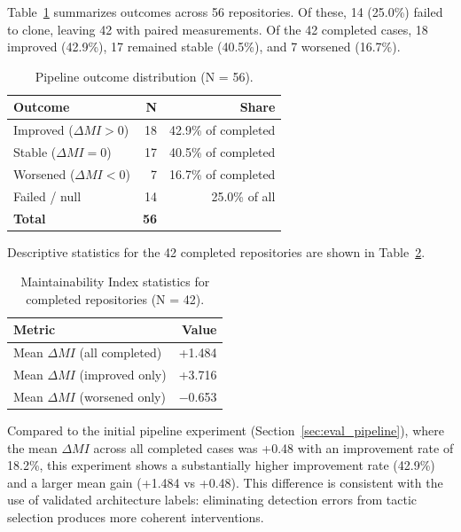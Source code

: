 \documentclass[sigconf,review,anonymous]{acmart}
\begin{document}
Table~\ref{tab:exp5_outcomes} summarizes outcomes across 56 repositories. Of these, 14 (25.0\%) failed to clone, leaving 42 with paired measurements. Of the 42 completed cases, 18 improved (42.9\%), 17 remained stable (40.5\%), and 7 worsened (16.7\%).

\begin{table}[H]
\centering
\small
\caption{Pipeline outcome distribution (N = 56).}
\label{tab:exp5_outcomes}
\begin{tabular}{lrr}
\toprule
\textbf{Outcome} & \textbf{N} & \textbf{Share} \\
\midrule
Improved ($\Delta MI > 0$)  & 18 & 42.9\% of completed \\
Stable ($\Delta MI = 0$)    & 17 & 40.5\% of completed \\
Worsened ($\Delta MI < 0$)  & 7  & 16.7\% of completed \\
Failed / null               & 14 & 25.0\% of all \\
\midrule
\textbf{Total} & \textbf{56} & \\
\bottomrule
\end{tabular}
\end{table}

Descriptive statistics for the 42 completed repositories are shown in Table~\ref{tab:exp5_mi}.

\begin{table}[H]
\centering
\small
\caption{Maintainability Index statistics for completed repositories (N = 42).}
\label{tab:exp5_mi}
\begin{tabular}{lr}
\toprule
\textbf{Metric} & \textbf{Value} \\
\midrule
Mean $\Delta MI$ (all completed)  & +1.484 \\
Mean $\Delta MI$ (improved only)  & +3.716 \\
Mean $\Delta MI$ (worsened only)  & $-$0.653 \\
\bottomrule
\end{tabular}
\end{table}

Compared to the initial pipeline experiment (Section~\ref{sec:eval_pipeline}), where the mean $\Delta MI$ across all completed cases was +0.48 with an improvement rate of 18.2\%, this experiment shows a substantially higher improvement rate (42.9\%) and a larger mean gain (+1.484 vs +0.48). This difference is consistent with the use of validated architecture labels: eliminating detection errors from tactic selection produces more coherent interventions.
\end{document}
